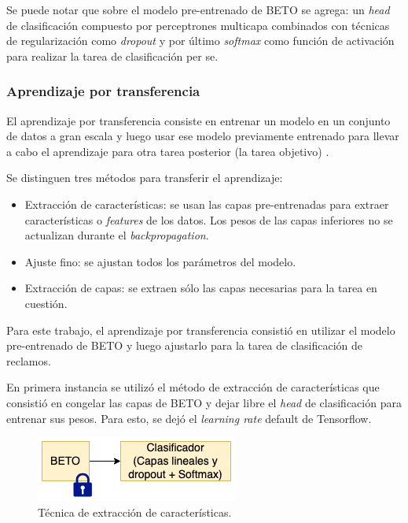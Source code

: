 Se puede notar que sobre el modelo pre-entrenado de BETO se agrega: un \textit{head} de clasificación compuesto por perceptrones multicapa combinados con técnicas de regularización como \textit{dropout} y por último \textit{softmax} como función de activación para realizar la tarea de clasificación per se.

\subsubsection{Aprendizaje por transferencia}
\label{section:tf}

El aprendizaje por transferencia consiste en entrenar un modelo en un conjunto de datos a gran escala y luego usar ese modelo previamente entrenado para llevar a cabo el aprendizaje para otra tarea posterior (la tarea objetivo) \citep{WEBSITE:24}.

Se distinguen tres métodos para transferir el aprendizaje:
\begin{itemize}
	\item Extracción de características: se usan las capas pre-entrenadas para extraer características o \textit{features} de los datos. Los pesos de las capas inferiores no se actualizan durante el \textit{backpropagation}.
	\item Ajuste fino: se ajustan todos los parámetros del modelo.
	\item Extracción de capas: se extraen sólo las capas necesarias para la tarea en cuestión.
\end{itemize}

Para este trabajo, el aprendizaje por transferencia consistió en utilizar el modelo pre-entrenado de BETO y luego ajustarlo para la tarea de clasificación de reclamos.

En primera instancia se utilizó el método de extracción de características que consistió en congelar las capas de BETO y dejar libre el \textit{head} de clasificación para entrenar sus pesos. Para esto, se dejó el \textit{learning rate} default de Tensorflow.

\begin{figure}[htbp]
	\centering
	\includegraphics[width=.4\textwidth]{./Figures/cap3-feature-extraction.png}
	\caption{Técnica de extracción de características.}
	\label{fig:cap3-feature-extraction}
\end{figure}

